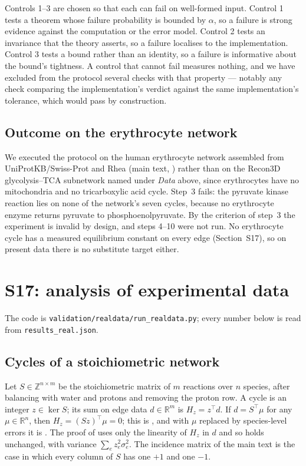 \documentclass[11pt,a4paper]{article}
\theoremstyle{definition}
\theoremstyle{remark}
\newcommand{\hol}{H}
\begin{document}
\begin{remark}
\label{rem:controls}
Controls 1--3 are chosen so that each can fail on well-formed input.
Control 1 tests a theorem whose failure probability is bounded by
$\alpha$, so a failure is strong evidence against the computation or the
error model. Control 2 tests an invariance that the theory asserts, so
a failure localises to the implementation. Control 3 tests a bound
rather than an identity, so a failure is informative about the bound's
tightness. A control that cannot fail measures nothing, and we have
excluded from the protocol several checks with that property --- notably
any check comparing the implementation's verdict against the same
implementation's tolerance, which would pass by construction.
\end{remark}


\subsection*{Outcome on the erythrocyte network}

We executed the protocol on the human erythrocyte network assembled from
UniProtKB/Swiss-Prot \citep{uniprot2025} and Rhea \citep{bansal2022}
(main text, ) rather than on the Recon3D glycolysis--TCA
subnetwork named under \emph{Data} above, since erythrocytes have no
mitochondria and no tricarboxylic acid cycle. Step~3 fails: the pyruvate
kinase reaction lies on none of the network's seven cycles, because no
erythrocyte enzyme returns pyruvate to phosphoenolpyruvate. By the
criterion of step~3 the experiment is invalid by design, and steps
4--10 were not run. No erythrocyte cycle has a measured equilibrium
constant on every edge (Section~S17), so on present data there is no
substitute target either.

\section*{S17: analysis of experimental data}

The code is \texttt{validation/realdata/run\_realdata.py}; every number
below is read from \texttt{results\_real.json}.

\subsection*{Cycles of a stoichiometric network}

Let $S\in\mathbb{Z}^{n\times m}$ be the stoichiometric matrix of $m$
reactions over $n$ species, after balancing with water and protons and
removing the proton row. A cycle is an integer $z\in\ker S$; its sum on
edge data $d\in\mathbb{R}^{m}$ is $\hol_z=z^{\top}d$. If
$d=S^{\top}\mu$ for any $\mu\in\mathbb{R}^{n}$, then
$\hol_z=(Sz)^{\top}\mu=0$; this is , and with $\mu$
replaced by species-level errors it is . The
proof of  uses only the linearity of $\hol_z$ in
$d$ and so holds unchanged, with variance $\sum_e z_e^{2}\sigma_e^{2}$.
The incidence matrix of the main text is the case in which every column
of $S$ has one $+1$ and one $-1$.
\end{document}
